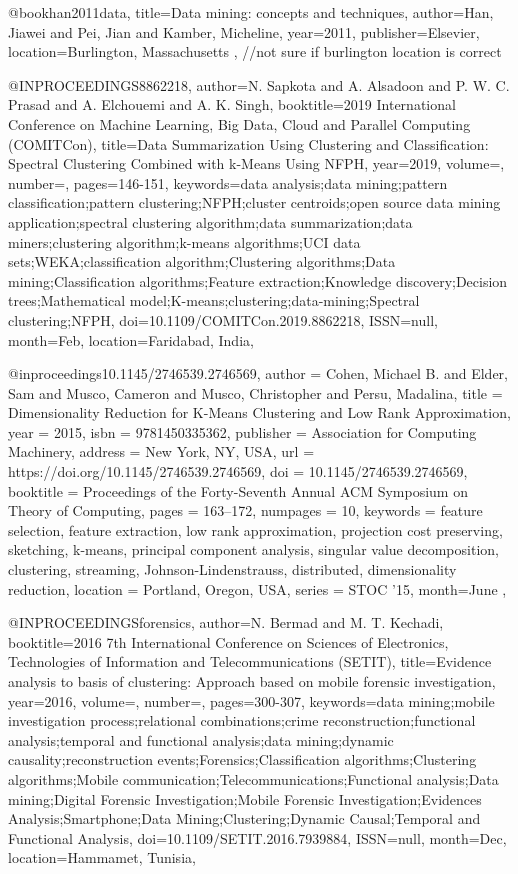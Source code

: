 @book{han2011data,
  title={Data mining: concepts and techniques},
  author={Han, Jiawei and Pei, Jian and Kamber, Micheline},
  year={2011},
  publisher={Elsevier},
  location={Burlington, Massachusetts}
},
//not sure if burlington location is correct


@INPROCEEDINGS{8862218, 
author={N. {Sapkota} and A. {Alsadoon} and P. W. C. {Prasad} and A. {Elchouemi} and A. K. {Singh}}, 
booktitle={2019 International Conference on Machine Learning, Big Data, Cloud and Parallel Computing (COMITCon)}, 
title={Data Summarization Using Clustering and Classification: Spectral Clustering Combined with k-Means Using NFPH}, 
year={2019}, 
volume={}, 
number={}, 
pages={146-151}, 
keywords={data analysis;data mining;pattern classification;pattern clustering;NFPH;cluster centroids;open source data mining application;spectral clustering algorithm;data summarization;data miners;clustering algorithm;k-means algorithms;UCI data sets;WEKA;classification algorithm;Clustering algorithms;Data mining;Classification algorithms;Feature extraction;Knowledge discovery;Decision trees;Mathematical model;K-means;clustering;data-mining;Spectral clustering;NFPH}, 
doi={10.1109/COMITCon.2019.8862218}, 
ISSN={null}, 
month={Feb},
location={Faridabad, India}},

@inproceedings{10.1145/2746539.2746569,
author = {Cohen, Michael B. and Elder, Sam and Musco, Cameron and Musco, Christopher and Persu, Madalina},
title = {Dimensionality Reduction for K-Means Clustering and Low Rank Approximation},
year = {2015},
isbn = {9781450335362},
publisher = {Association for Computing Machinery},
address = {New York, NY, USA},
url = {https://doi.org/10.1145/2746539.2746569},
doi = {10.1145/2746539.2746569},
booktitle = {Proceedings of the Forty-Seventh Annual ACM Symposium on Theory of Computing},
pages = {163–172},
numpages = {10},
keywords = {feature selection, feature extraction, low rank approximation, projection cost preserving, sketching, k-means, principal component analysis, singular value decomposition, clustering, streaming, Johnson-Lindenstrauss, distributed, dimensionality reduction},
location = {Portland, Oregon, USA},
series = {STOC ’15},
month={June}
},

@INPROCEEDINGS{forensics, 
author={N. {Bermad} and M. T. {Kechadi}}, 
booktitle={2016 7th International Conference on Sciences of Electronics, Technologies of Information and Telecommunications (SETIT)}, 
title={Evidence analysis to basis of clustering: Approach based on mobile forensic investigation}, 
year={2016}, 
volume={}, 
number={}, 
pages={300-307}, 
keywords={data mining;mobile investigation process;relational combinations;crime reconstruction;functional analysis;temporal and functional analysis;data mining;dynamic causality;reconstruction events;Forensics;Classification algorithms;Clustering algorithms;Mobile communication;Telecommunications;Functional analysis;Data mining;Digital Forensic Investigation;Mobile Forensic Investigation;Evidences Analysis;Smartphone;Data Mining;Clustering;Dynamic Causal;Temporal and Functional Analysis}, 
doi={10.1109/SETIT.2016.7939884}, 
ISSN={null}, 
month={Dec},
location={Hammamet, Tunisia}},

